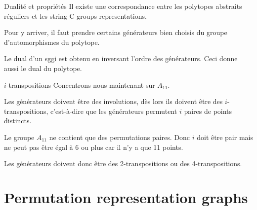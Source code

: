 \documentclass[10pt]{beamer}
\begin{document}
\begin{frame}{Dualité et propriétés}
  Il existe une correspondance entre les polytopes abstraits réguliers et les string C-groups representations.

  Pour y arriver, il faut prendre certains générateurs bien choisis du groupe d'automorphismes du polytope.

  Le dual d'un sggi est obtenu en inversant l'ordre des générateurs. Ceci donne aussi le dual du polytope.
\end{frame}

\begin{frame}{$i$-transpositions}
  Concentrons nous maintenant sur $A_{11}$.

  Les générateurs doivent être des involutions, dès lors ils doivent être des $i$-transpositions, c'est-à-dire que les générateurs permutent $i$ paires de points distincts.

  Le groupe $A_{11}$ ne contient que des permutations paires. Donc $i$ doit être pair mais ne peut pas être égal à 6 ou plus car il n'y a que 11 points.

  Les générateurs doivent donc être des 2-transpositions ou des 4-transpositions.
\end{frame}

\section{Permutation representation graphs}
\end{document}
